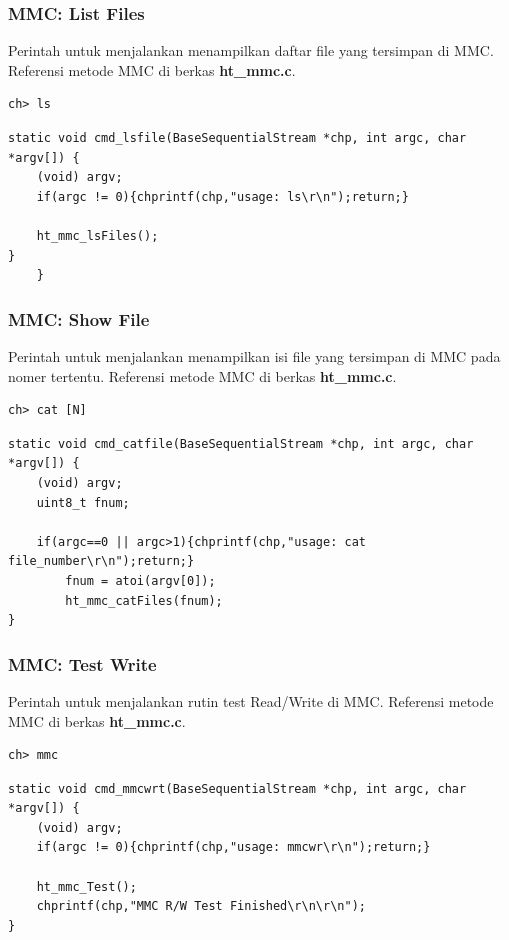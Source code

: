 \documentclass[12pt,]{article}
\begin{document}
	\subsubsection{MMC: List Files}
	Perintah untuk menjalankan menampilkan daftar file yang tersimpan di MMC.
	Referensi metode MMC di berkas \textbf{ht\_mmc.c}.
	\begin{verbatim}
ch> ls
	\end{verbatim}
	
	\begin{verbatim}
static void cmd_lsfile(BaseSequentialStream *chp, int argc, char *argv[]) {
	(void) argv;
	if(argc != 0){chprintf(chp,"usage: ls\r\n");return;}
	
	ht_mmc_lsFiles();
}
	}
	\end{verbatim}
	
	\subsubsection{MMC: Show File}
	Perintah untuk menjalankan menampilkan isi file yang tersimpan di MMC pada nomer tertentu.
	Referensi metode MMC di berkas \textbf{ht\_mmc.c}.
	\begin{verbatim}
ch> cat [N]
	\end{verbatim}
	
	\begin{verbatim}
static void cmd_catfile(BaseSequentialStream *chp, int argc, char *argv[]) {
	(void) argv;
	uint8_t fnum;
	
	if(argc==0 || argc>1){chprintf(chp,"usage: cat file_number\r\n");return;}
		fnum = atoi(argv[0]);
		ht_mmc_catFiles(fnum);
}
	\end{verbatim}
	
	\subsubsection{MMC: Test Write}
	Perintah untuk menjalankan rutin test Read/Write di MMC.
	Referensi metode MMC di berkas \textbf{ht\_mmc.c}.
	\begin{verbatim}
ch> mmc
	\end{verbatim}
	
	\begin{verbatim}
static void cmd_mmcwrt(BaseSequentialStream *chp, int argc, char *argv[]) {
	(void) argv;
	if(argc != 0){chprintf(chp,"usage: mmcwr\r\n");return;}
	
	ht_mmc_Test();
	chprintf(chp,"MMC R/W Test Finished\r\n\r\n");
}
	\end{verbatim}
	
\end{document}
